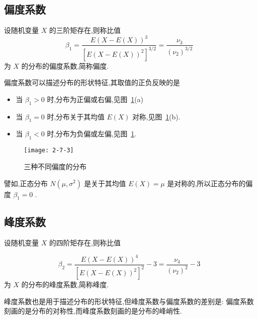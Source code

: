 \subsection{偏度系数}

\begin{definition}{}{}
	设随机变量 $ X $ 的三阶矩存在,则称比值
	\begin{equation}
	\beta_{1}=\frac{E(X-E(X))^{3}}{\left[E(X-E(X))^{2}\right]^{3 / 2}}=\frac{\nu_{3}}{\left(\nu_{2}\right)^{3 / 2}} \label{eq:2.7.9}
	\end{equation}
	为 $ X $ 的分布的偏度系数,简称偏度.
	
\end{definition}

偏度系数可以描述分布的形状特征,其取值的正负反映的是

\begin{itemize}
	\item 当 $ \beta_{1}>0 $ 时,分布为正偏或右偏,见图~\ref{fig:2-7-3}(a)
	\item 当 $ \beta_{1}=0 $ 时,分布关于其均值 $ E(X) $ 对称,见图~\ref{fig:2-7-3}(b).
	\item 当 $ \beta_{1}<0 $ 时,分布为负偏或左偏,见图~\ref{fig:2-7-3}.
\end{itemize}

\begin{figure}
	\centering
	\texttt{[image: 2-7-3]}
	\caption{三种不同偏度的分布}
	\label{fig:2-7-3}
\end{figure}


譬如,正态分布 $ N\left(\mu, \sigma^{2}\right) $ 是关于其均值 $ E(X)=\mu $ 是对称的,所以正态分布的偏度 $ \beta_{1}=0 $ .

\subsection{峰度系数}

\begin{definition}
	设随机变量 $ X $ 的四阶矩存在,则称比值
	
	\begin{equation}
	\beta_{2}=\frac{E(X-E(X))^{4}}{\left[E(X-E(X))^{2}\right]^{2}}-3=\frac{\nu_{4}}{\left(\nu_{2}\right)^{2}}-3 \label{eq:2.7.10}
	\end{equation}
	为 $ X $ 的分布的峰度系数,简称峰度.
\end{definition}

峰度系数也是用于描述分布的形状特征,但峰度系数与偏度系数的差别是:
偏度系数刻画的是分布的对称性,而峰度系数刻画的是分布的峰峭性.

